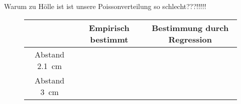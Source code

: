 Warum zu Hölle ist ist unsere Poissonverteilung so schlecht???!!!!!

      \begin{figure}[h!]
   	  	\centering
   	  	\begin{tabular}{c|c|c}
   	  		 & Empirisch bestimmt & Bestimmung durch Regression \\
   	  		\hline
   	  	Abstand \SI{2.1}{\centi\meter} &    &   \\
   	  	Abstand \SI{3}{\centi\meter} &   &  
   	  	\end{tabular}
   	  	\label{tab:energie_vergleich}
   	  \end{figure}